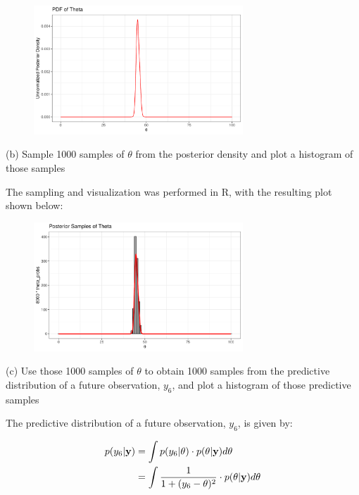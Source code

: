 \documentclass[12pt]{article}
\def\by{{\rm {\bf{y}}}}
\begin{document}
\begin{figure}[h]
    \centering
    \includegraphics[width=0.7\textwidth]{q4a_plot.pdf}
\end{figure}

(b) Sample 1000 samples of $\theta$ from the posterior density and plot a histogram of those samples

The sampling and visualization was performed in R, with the resulting plot shown below:

\begin{figure}[h]
    \centering
    \includegraphics[width=0.7\textwidth]{q4b_plot.pdf}
\end{figure}

\pagebreak

(c) Use those 1000 samples of $\theta$ to obtain 1000 samples from the predictive distribution of a future observation, $y_6$, and plot a histogram of those predictive samples

The predictive distribution of a future observation, $y_6$, is given by:

\begin{align*}
p(y_6 | \by) &= \int p(y_6 | \theta) \cdot p(\theta | \by) d\theta \\
&= \int \frac{1}{1 + (y_6 - \theta)^2} \cdot p(\theta | \by) d\theta \\
\end{align*}
\end{document}
